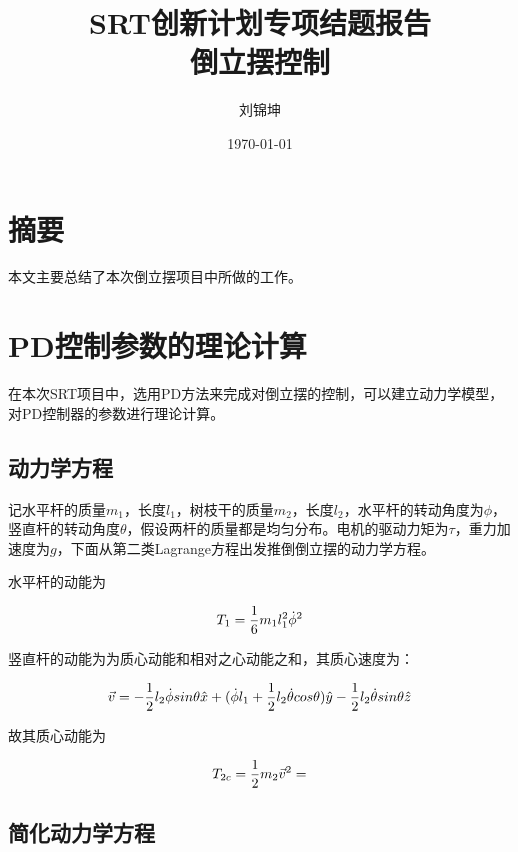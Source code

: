 \documentclass[UTF8]{ctexart}
\title{SRT创新计划专项结题报告\\倒立摆控制}
\author{刘锦坤}
\date{\today}
\begin{document}
\fancyfoot[C]{\thepage}

\maketitle
\tableofcontents
\newpage

\section{摘要}

本文主要总结了本次倒立摆项目中所做的工作。

\section{PD控制参数的理论计算}

在本次SRT项目中，选用PD方法来完成对倒立摆的控制，可以建立动力学模型，对PD控制器的参数进行理论计算。

\subsection{动力学方程}

记水平杆的质量$m_1$，长度$l_1$，树枝干的质量$m_2$，长度$l_2$，水平杆的转动角度为$\phi$，竖直杆的转动角度$\theta$，假设两杆的质量都是均匀分布。电机的驱动力矩为$\tau$，重力加速度为$g$，下面从第二类Lagrange方程出发推倒倒立摆的动力学方程。

水平杆的动能为

\begin{equation}
    T_1 = \frac{1}{6} m_1 l_1^2 {\dot{\phi}}^2
\end{equation}

竖直杆的动能为为质心动能和相对之心动能之和，其质心速度为：

\begin{equation}
    \vec v = -\frac{1}{2} l_2 \dot{\phi} sin \theta \hat x
    +(\dot{\phi} l_1+\frac{1}{2} l_2 \dot{\theta} cos \theta )\hat y
    - \frac{1}{2} l_2 \dot{\theta} sin \theta \hat z 
\end{equation}

故其质心动能为

\begin{equation}
    T_{2c} = \frac{1}{2} m_2 \vec v^2 
    = 
\end{equation}


\subsection{简化动力学方程}
\end{document}
